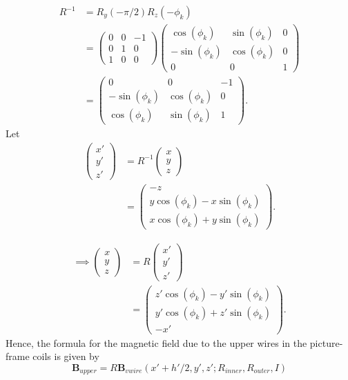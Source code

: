 \documentclass{article}
\begin{document}
\[\begin{aligned}
    R^{-1} &= R_y(-\pi/2)R_z(-\phi_k) \\
    &= \begin{pmatrix}
        0 & 0 & -1 \\
        0 & 1 & 0 \\
        1 & 0 & 0
    \end{pmatrix}
    \begin{pmatrix}
        \cos(\phi_k) & \sin(\phi_k) & 0 \\
        -\sin(\phi_k) & \cos(\phi_k) & 0 \\
        0 & 0 & 1
    \end{pmatrix} \\
    &= \begin{pmatrix}
        0 & 0 & -1 \\
        -\sin(\phi_k) & \cos(\phi_k) & 0 \\
        \cos(\phi_k) & \sin(\phi_k) & 1
    \end{pmatrix}.
\end{aligned}\]
Let 
\[\begin{aligned}
    \begin{pmatrix}
        x' \\ y' \\ z'
    \end{pmatrix} &= R^{-1}
    \begin{pmatrix}
        x \\ y \\ z
    \end{pmatrix} \\
    &= \begin{pmatrix}
        -z \\
        y \cos(\phi_k) - x \sin(\phi_k) \\
        x \cos(\phi_k) + y \sin(\phi_k)
    \end{pmatrix}.
\end{aligned}\]

\[\begin{aligned}
\implies
\begin{pmatrix}
    x \\ y \\ z
\end{pmatrix} &= 
R
\begin{pmatrix}
    x' \\ y' \\ z'
\end{pmatrix} \\
&= \begin{pmatrix}
    z'\cos(\phi_k)-y'\sin(\phi_k)  \\
    y'\cos(\phi_k) +z'\sin(\phi_k) \\
    -x'
\end{pmatrix}.
\end{aligned}\]
Hence, the formula for the magnetic field due to the upper wires in the 
 picture-frame coils is given by
\[\mathbf{B}_{upper} = R\mathbf{B}_{vwire}(x' + h'/2, y', z'; R_{inner}, R_{outer}, I)\]
\end{document}
